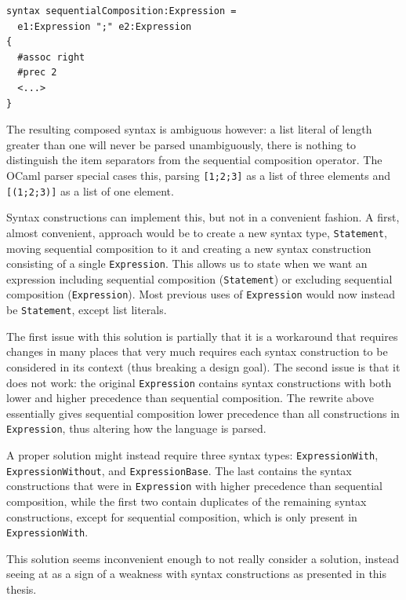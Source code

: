 \documentclass{kththesis}
\begin{document}
\begin{verbatim}
syntax sequentialComposition:Expression =
  e1:Expression ";" e2:Expression
{
  #assoc right
  #prec 2
  <...>
}
\end{verbatim}

The resulting composed syntax is ambiguous however: a list literal of length greater than one will never be parsed unambiguously, there is nothing to distinguish the item separators from the sequential composition operator. The OCaml parser special cases this, parsing \texttt{[1;2;3]} as a list of three elements and \texttt{[(1;2;3)]} as a list of one element.

Syntax constructions can implement this, but not in a convenient fashion. A first, almost convenient, approach would be to create a new syntax type, \texttt{Statement}, moving sequential composition to it and creating a new syntax construction consisting of a single \texttt{Expression}. This allows us to state when we want an expression including sequential composition (\texttt{Statement}) or excluding sequential composition (\texttt{Expression}). Most previous uses of \texttt{Expression} would now instead be \texttt{Statement}, except list literals.

The first issue with this solution is partially that it is a workaround that requires changes in many places that very much requires each syntax construction to be considered in its context (thus breaking a design goal). The second issue is that it does not work: the original \texttt{Expression} contains syntax constructions with both lower and higher precedence than sequential composition. The rewrite above essentially gives sequential composition lower precedence than all constructions in \texttt{Expression}, thus altering how the language is parsed.

A proper solution might instead require three syntax types: \texttt{ExpressionWith}, \texttt{ExpressionWithout}, and \texttt{ExpressionBase}. The last contains the syntax constructions that were in \texttt{Expression} with higher precedence than sequential composition, while the first two contain duplicates of the remaining syntax constructions, except for sequential composition, which is only present in \texttt{ExpressionWith}.

This solution seems inconvenient enough to not really consider a solution, instead seeing at as a sign of a weakness with syntax constructions as presented in this thesis.
\end{document}
